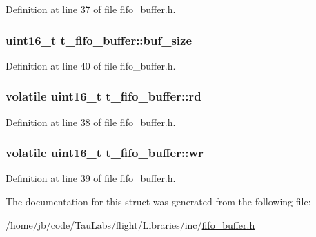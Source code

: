 \-Definition at line 37 of file fifo\-\_\-buffer.\-h.

\hypertarget{structt__fifo__buffer_a2ffa256dbcc216fcf1300aff50d41c3e}{
\subsubsection[{buf\-\_\-size}]{\setlength{\rightskip}{0pt plus 5cm}uint16\-\_\-t {\bf t\-\_\-fifo\-\_\-buffer\-::buf\-\_\-size}}}\label{structt__fifo__buffer_a2ffa256dbcc216fcf1300aff50d41c3e}


\-Definition at line 40 of file fifo\-\_\-buffer.\-h.

\hypertarget{structt__fifo__buffer_af64a7e9ffdbe3eea93ad06b891189179}{
\subsubsection[{rd}]{\setlength{\rightskip}{0pt plus 5cm}volatile uint16\-\_\-t {\bf t\-\_\-fifo\-\_\-buffer\-::rd}}}\label{structt__fifo__buffer_af64a7e9ffdbe3eea93ad06b891189179}


\-Definition at line 38 of file fifo\-\_\-buffer.\-h.

\hypertarget{structt__fifo__buffer_a499ed012a0f43ac65deb1bbbe28689fd}{
\subsubsection[{wr}]{\setlength{\rightskip}{0pt plus 5cm}volatile uint16\-\_\-t {\bf t\-\_\-fifo\-\_\-buffer\-::wr}}}\label{structt__fifo__buffer_a499ed012a0f43ac65deb1bbbe28689fd}


\-Definition at line 39 of file fifo\-\_\-buffer.\-h.



\-The documentation for this struct was generated from the following file\-:\begin{DoxyCompactItemize}
\item 
/home/jb/code/\-Tau\-Labs/flight/\-Libraries/inc/\hyperlink{fifo__buffer_8h}{fifo\-\_\-buffer.\-h}\end{DoxyCompactItemize}
